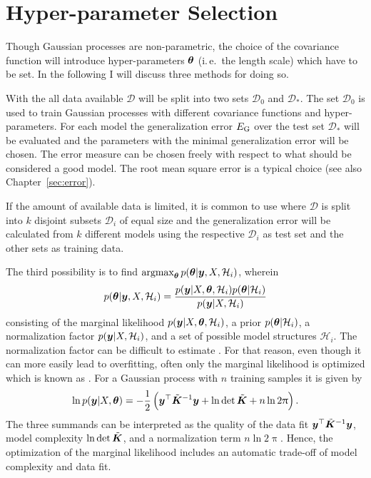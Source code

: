 \section{Hyper-parameter Selection}
Though Gaussian processes are non-parametric, the choice of the covariance 
function will introduce hyper-parameters $\bm{\theta}$ (i.\,e.~the length scale) 
which have to be set.  In the following I will discuss three methods for doing 
so.

With the  all data available $\mathcal{D}$ will be 
split into two sets $\mathcal{D}_0$ and $\mathcal{D}_*$. The set $\mathcal{D}_0$ 
is used to train Gaussian processes with different covariance functions and 
hyper-parameters. For each model the generalization error $E_{\mathrm{G}}$ over the 
test set $\mathcal{D}_*$ will be evaluated and the parameters with the minimal 
generalization error will be chosen. The error measure can be chosen freely with 
respect to what should be considered a good model. The root mean square error is 
a typical choice (see also Chapter~\ref{sec:error}).

If the amount of available data is limited, it is common to use 
 where $\mathcal{D}$ is split into $k$ 
disjoint subsets $\mathcal{D}_i$ of equal size and the generalization error will 
be calculated from $k$ different models using the respective $\mathcal{D}_i$ as 
test set and the other sets as training data.

The third possibility is to find $\operatorname*{argmax}_{\bm{\theta}} p(\bm{\theta} | \bm{y}, X, 
\mathcal{H}_i)$, wherein
\begin{equation}
    p(\bm{\theta} | \bm{y}, X, \mathcal{H}_i) = \frac{p(\bm{y} | X, \bm{\theta}, 
        \mathcal{H}_i) p(\bm{\theta} | \mathcal{H}_i)}{p(\bm{y} | X, 
        \mathcal{H}_i)}
\end{equation}
consisting of the marginal likelihood $p(\bm{y} | X, \bm{\theta}, \mathcal{H}_i)$, 
a prior $p(\bm{\theta} | \mathcal{H}_i)$, a normalization factor $p(\bm{y} | X, 
\mathcal{H}_i)$, and a set of possible model structures $\mathcal{H}_i$. The 
normalization factor can be difficult to estimate 
\parencite[109]{Rasmussen:2006vz}. For that reason, even though it can more 
easily lead to overfitting, often only the marginal likelihood is optimized 
which is known as . For a Gaussian 
process with $n$ training samples it is given by
\begin{equation}
    \ln p(\vc y | X, \vc\theta) = -\frac{1}{2}\del{\vc y\Tr \tilde{\mat{K}}^{-1} 
        \vc y + \ln \det \tilde{\mat K} + n \ln 2\uppi} \text{.}
\end{equation}
The three summands can be interpreted as the quality of the data fit $\bm{y}^{\top} 
\tilde{\bm{K}}^{-1} \bm{y}$, model complexity $\ln \det \tilde{\bm{K}}$, and 
a normalization term $n \ln 2\uppi$. Hence, the optimization of the marginal 
likelihood includes an automatic trade-off of model complexity and data fit.

